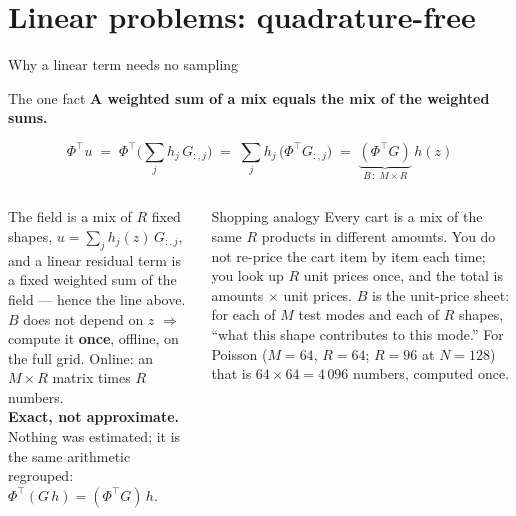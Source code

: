 \documentclass[10pt,aspectratio=169]{beamer}
\newcommand{\T}{^{\top}}
\begin{document}
\section{Linear problems: quadrature-free}
\begin{frame}{Why a linear term needs no sampling}
  \begin{block}{The one fact}
    \centering
    \textbf{A weighted sum of a mix equals the mix of the weighted sums.}
  \end{block}
  \[
    \Phi\T u \;=\; \Phi\T\Big(\sum_j h_j\,G_{:,j}\Big) \;=\; \sum_j h_j\,\big(\Phi\T G_{:,j}\big) \;=\; \underbrace{(\Phi\T G)}_{B\,:\;M\times R}\,h(z)
  \]
  \footnotesize
  \begin{columns}[T]
    The field is a mix of $R$ fixed shapes, $u = \sum_j h_j(z)\,G_{:,j}$, and a linear residual term is a fixed weighted sum of the field --- hence the line above.
    $B$ does not depend on $z$ $\Rightarrow$ compute it \textbf{once}, offline, on the full grid. Online: an $M\times R$ matrix times $R$ numbers.\\[4pt]
    \textbf{Exact, not approximate.} Nothing was estimated; it is the same arithmetic regrouped: $\Phi\T(G\,h)=(\Phi\T G)\,h$.
    \begin{exampleblock}{Shopping analogy}
      Every cart is a mix of the same $R$ products in different amounts. You do not re-price the cart item by item each time; you look up $R$ unit prices once, and the total is amounts $\times$ unit prices.
      $B$ is the unit-price sheet: for each of $M$ test modes and each of $R$ shapes, ``what this shape contributes to this mode.'' For Poisson ($M=64$, $R=64$; $R=96$ at $N=128$) that is $64\times64 = 4\,096$ numbers, computed once.
    \end{exampleblock}
  \end{columns}
\end{frame}
\end{document}
